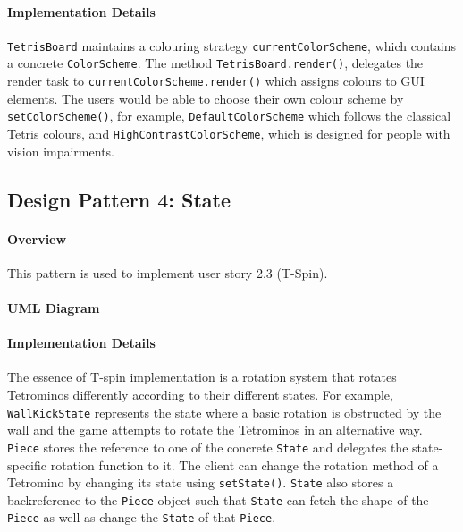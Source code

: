 \documentclass{article}
\begin{document}
\begin{figure}[H]
    
\end{figure}

\paragraph{Implementation Details}

\verb`TetrisBoard` maintains a colouring strategy \verb`currentColorScheme`, which contains a concrete
\verb`ColorScheme`. The method \verb`TetrisBoard.render()`, delegates the render task to \verb`currentColorScheme.render()` which assigns colours to GUI elements. The users would be able to choose their own colour scheme by \verb`setColorScheme()`, for example, \verb`DefaultColorScheme` which follows the classical Tetris colours, and \verb`HighContrastColorScheme`, which is designed for people with vision impairments.

\clearpage

\subsection{Design Pattern 4: State}

\paragraph{Overview}
This pattern is used to implement user story 2.3 (T-Spin).

\paragraph{UML Diagram}\hfill

\begin{figure}[H]
    
\end{figure}

\paragraph{Implementation Details}

The essence of T-spin implementation is a rotation system that rotates Tetrominos differently according to their different states. For example, \verb`WallKickState` represents the state where a basic rotation is obstructed by the wall and the game attempts to rotate the Tetrominos in an alternative way. \verb`Piece` stores the reference to one of the concrete \verb`State` and delegates the state-specific rotation function to it. The client can change the rotation method of a Tetromino by changing its state using \verb`setState()`. \verb`State` also stores a backreference to the \verb`Piece` object such that \verb`State` can fetch the shape of the \verb`Piece` as well as change the \verb`State` of that \verb`Piece`.
\end{document}
